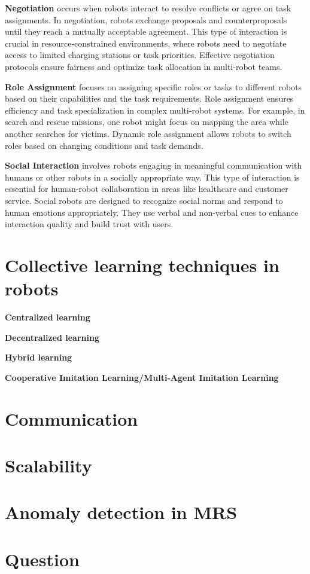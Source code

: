 \textbf{Negotiation} occurs when robots interact to resolve conflicts or agree on task assignments. In negotiation, robots exchange proposals and counterproposals until they reach a mutually acceptable agreement. This type of interaction is crucial in resource-constrained environments, where robots need to negotiate access to limited charging stations or task priorities. Effective negotiation protocols ensure fairness and optimize task allocation in multi-robot teams. 

\textbf{Role Assignment} focuses on assigning specific roles or tasks to different robots based on their capabilities and the task requirements. Role assignment ensures efficiency and task specialization in complex multi-robot systems. For example, in search and rescue missions, one robot might focus on mapping the area while another searches for victims. Dynamic role assignment allows robots to switch roles based on changing conditions and task demands. 

\textbf{Social Interaction} involves robots engaging in meaningful communication with humans or other robots in a socially appropriate way. This type of interaction is essential for human-robot collaboration in areas like healthcare and customer service. Social robots are designed to recognize social norms and respond to human emotions appropriately. They use verbal and non-verbal cues to enhance interaction quality and build trust with users. 


\section{Collective learning techniques in robots}
\textbf{Centralized learning}

\textbf{Decentralized learning}

\textbf{Hybrid learning}

\textbf{Cooperative Imitation Learning/Multi-Agent Imitation Learning}


\section{Communication}


\section{Scalability}


\section{Anomaly detection in MRS}


\section{Question}
   
